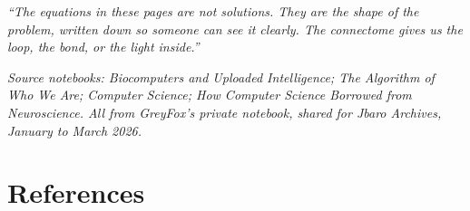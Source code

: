 \documentclass[12pt, a4paper]{article}
\begin{document}
\begin{displayquote}
\itshape
``The equations in these pages are not solutions. They are the shape of the problem, written down so
someone can see it clearly. The connectome gives us the loop, the bond, or the light inside.''
\end{displayquote}

\vspace{0.5em}
{\small\itshape Source notebooks: Biocomputers and Uploaded Intelligence; The Algorithm of Who We
Are; Computer Science; How Computer Science Borrowed from Neuroscience. All from GreyFox's private
notebook, shared for Jbaro Archives, January to March 2026.}

\newpage
\section*{References}
\renewcommand{\section}[2]{}%
\end{document}
